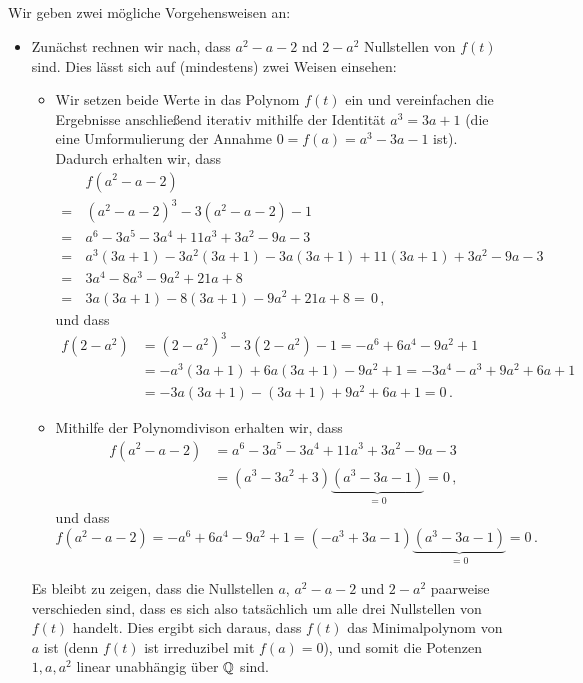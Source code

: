 \subsection{}

Wir geben zwei mögliche Vorgehensweisen an:

\begin{itemize}
  \item
    Zunächst rechnen wir nach, dass $a^2 - a - 2$ nd $2 - a^2$ Nullstellen von $f(t)$ sind.
    Dies lässt sich auf (mindestens) zwei Weisen einsehen:
    \begin{itemize}
      \item
        Wir setzen beide Werte in das Polynom $f(t)$ ein und vereinfachen die Ergebnisse anschließend iterativ mithilfe der Identität $a^3 = 3a + 1$ (die eine Umformulierung der Annahme $0 = f(a) = a^3 - 3a - 1$ ist).
        Dadurch erhalten wir, dass
        \begin{align*}
           &\,  f(a^2 - a - 2)  \\
          =&\,  (a^2 - a - 2)^3 - 3(a^2 - a - 2) - 1  \\
          =&\,  a^6 - 3a^5 - 3a^4 + 11a^3 + 3a^2 - 9a - 3 \\
          =&\,  a^3(3a + 1) - 3a^2(3a + 1) - 3a(3a + 1) + 11(3a + 1) + 3a^2 - 9a - 3  \\
          =&\,  3a^4 - 8a^3 - 9 a^2 + 21a + 8 \\
          =&\,  3a(3a+1) - 8(3a+1) - 9a^2 + 21a + 8
          = \,  0 \,,
        \end{align*}
        und dass
        \begin{align*}
                f(2 - a^2)
          &=   (2 - a^2)^3 - 3(2 - a^2) - 1
            =   -a^6 + 6a^4 - 9a^2 + 1  \\
          &=   -a^3(3a+1) + 6a(3a+1) - 9a^2 + 1
            =   -3a^4 - a^3 + 9a^2 + 6a + 1 \\
          &=   -3a(3a+1) - (3a+1) + 9a^2 + 6a + 1
            =   0 \,.
        \end{align*}
      \item
        Mithilfe der Polynomdivison erhalten wir, dass
        \begin{align*}
              f(a^2 - a - 2)
          &=  a^6 - 3a^5 - 3a^4 + 11a^3 + 3a^2 - 9a - 3 \\
          &=  (a^3 - 3a^2 + 3)\underbrace{(a^3 - 3a - 1)}_{=0}
          =   0 \,,
        \end{align*}
        und dass
        \[
              f(a^2 - a - 2)
          =  -a^6 + 6a^4 - 9a^2 + 1
          =  (-a^3 + 3a - 1)\underbrace{(a^3 - 3a - 1)}_{=0}
          =   0 \,.
        \]
    \end{itemize}
    Es bleibt zu zeigen, dass die Nullstellen $a$, $a^2 - a - 2$ und $2 - a^2$ paarweise verschieden sind, dass es sich also tatsächlich um alle drei Nullstellen von $f(t)$ handelt.
    Dies ergibt sich daraus, dass $f(t)$ das Minimalpolynom von $a$ ist (denn $f(t)$ ist irreduzibel mit $f(a) = 0$), und somit die Potenzen $1, a, a^2$ linear unabhängig über $\mathbb{Q}$ sind.
    

\end{itemize}
